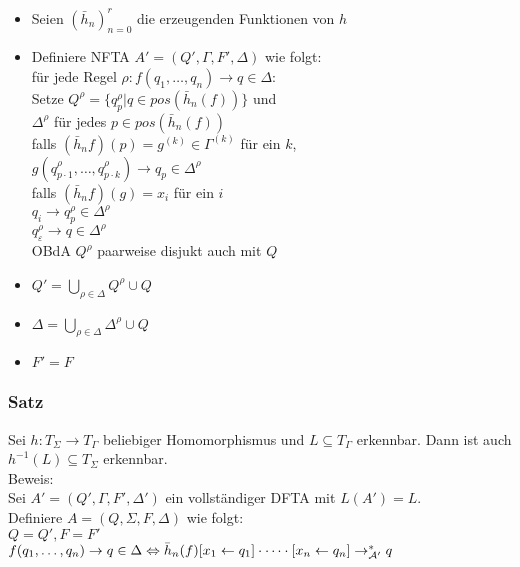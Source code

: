\documentclass[titlepage]{article}
\begin{document}
\begin{itemize}
	\item Seien $(\bar{h}_n)_{n=0}^r$ die erzeugenden Funktionen von $h$
	\item Definiere NFTA $A' = (Q', \Gamma, F', \Delta)$ wie folgt:\\
		f\"ur jede Regel $\rho: f(q_1, \dots , q_n) \to q \in \Delta:$\\
			Setze $Q^\rho = \{ q_p^\rho | q \in pos(\bar{h}_n(f))\}$ und\\
			$\Delta ^\rho$ f\"ur jedes $p \in pos(\bar{h}_n(f))$\\
			falls $(\bar{h}_n f)(p) = g^{(k)} \in \Gamma^{(k)}$ f\"ur ein $k$,\\
			$g(q_{p \cdot 1}^\rho, \dots, q_{p \cdot k}^\rho) \to q_p \in \Delta^\rho$\\
			falls $(\bar{h}_n f)(g) = x_i$ f\"ur ein $i$\\
			$q_i \to q_p^\rho \in \Delta^\rho$\\
			$q_\varepsilon^\rho \to q \in \Delta^\rho$\\
			OBdA $Q^\rho$ paarweise disjukt auch mit $Q$\\
	\item $Q' = \bigcup\limits_{\rho \in \Delta} Q^\rho \cup Q$
	\item $\Delta = \bigcup\limits_{\rho \in \Delta} \Delta^\rho \cup Q$
	\item $F' = F$ 
\end{itemize}

\subsubsection{Satz}

Sei $h: T_\Sigma \to T_\Gamma$ beliebiger Homomorphismus und $L \subseteq T_\Gamma$ erkennbar.
Dann ist auch $h^{-1}(L) \subseteq T_\Sigma$ erkennbar.\\

Beweis:\\
Sei $A' = (Q', \Gamma, F', \Delta')$ ein vollst\"andiger DFTA mit $L(A') = L$.\\
Definiere $A = (Q, \Sigma, F, \Delta)$ wie folgt:\\
$Q = Q', F = F'$\\
$f(q_1, \dots, q_n) \to q \in \Delta \\
\Leftrightarrow \bar{h}_n (f)[x_1 \leftarrow q_1] \cdot \dots \cdot 
[x_n \leftarrow q_n] \to_{\mathcal{A}'}^\ast q$\\
\end{document}

